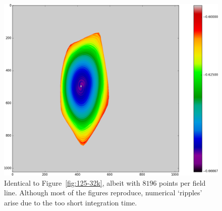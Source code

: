\documentclass{article}
\begin{document}
\begin{figure}[!hb]
\endminipage\hfill
{}
  \includegraphics[width=\linewidth]{Figures/Rings_Papertwist_twist1_125_steps8k.png}
	\caption{Identical to Figure~\ref{fig:125-32k}, albeit with $8196$ points per field line. Although most of the figures reproduce, numerical `ripples' arise due to the too short integration time.}\label{fig:125-8k}
\endminipage
\end{figure}

\FloatBarrier
\end{document}
